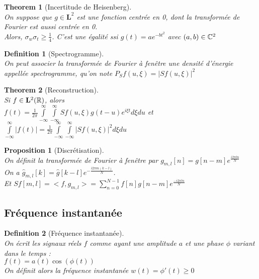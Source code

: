\documentclass[a4paper]{article}
\newtheorem*{prop}{Proposition}
\newtheorem*{definition}{Definition}
\newtheorem*{theorem}{Theorem}
\newcommand{\R}{\ensuremath\mathbb{R}}
\newcommand{\C}{\ensuremath\mathbb{C}}
\renewcommand{\geq}{\geqslant}
\renewcommand{\(}{\left(}
\renewcommand{\)}{\right)}
\begin{document}
\begin{theorem}[Incertitude de Heisenberg]~\\
  On suppose que $g \in \mathbf{L}^2$ est une fonction centrée en 0, dont la
  transformée de Fourier est aussi centrée en 0.\\
  Alors, $\sigma_w\sigma_t \geq \frac{1}{4}$. C'est une égalité ssi $g(t) =
  ae^{-bt^2}$ avec $(a,b) \in \C^2$
\end{theorem}

\begin{definition}[Spectrogramme]~\\
  On peut associer la transformée de Fourier à fenêtre une densité d'énergie
  appellée spectrogramme, qu'on note $P_Sf(u,\xi) = |Sf(u,\xi)|^2$
\end{definition}

\begin{theorem}[Reconstruction]~\\
  Si $f \in \mathbf{L}^2(\R)$, alors \\
  $f(t) = \frac{1}{2\pi}\int\limits_{-\infty}^{\infty}\int\limits_{-\infty}^{\infty}
  Sf(u,\xi)g(t-u)e^{i\xi t} d\xi du$ et\\
  $\int\limits_{-\infty}^\infty |f(t)| =
  \frac{1}{2\pi}\int\limits_{-\infty}^{\infty}\int\limits_{-\infty}^{\infty}
  |Sf(u,\xi)|^2d\xi du$
\end{theorem}

\begin{prop}[Discrétisation]~\\
  On définit la transformée de Fourier à fenêtre par $g_{m,l}[n] =
  g[n-m]e^{\frac{i2\pi ln}{N}}$\\
  On a $\hat{g}_{m,l}[k] = \hat{g}[k-l]e^{-\frac{i2\pi m(k-l)}{N}}$.\\
  Et $Sf[m,l] = <f,g_{m,l}> = \sum\limits_{n=0}^{N-1}f[n]g[n-m]e^{\frac{-i2\pi l n}{N}}$
\end{prop}

\subsection{Fréquence instantanée}

\begin{definition}[Fréquence instantanée]~\\
  On écrit les signaux réels $f$ comme ayant une amplitude $a$ et une phase
  $\phi$ variant dans le temps :\\
  $f(t) = a(t) \cos\(\phi(t)\)$\\
  On définit alors la fréquence instantanée $w(t) = \phi'(t) \geq 0$
\end{definition}
\end{document}
